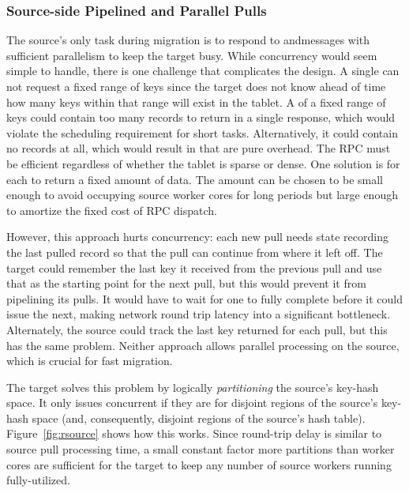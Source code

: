 \subsubsection{Source-side Pipelined and Parallel Pulls}
\label{sec:source}
The source's only task during migration is to respond
to \pull and\linebreak{}\priopull messages with sufficient parallelism to
keep the target busy. While concurrency would seem
simple to handle, there is one challenge that complicates the design.
A single \pull can not request a fixed range of keys since the target does not know
ahead of time how many keys within that range will exist in the tablet. A \pull of a fixed range of keys
could contain too many records to return in a single response, which would violate
the scheduling requirement for short tasks. Alternatively, it could contain no
records at all, which would result in \pulls that are pure overhead.
The \pull RPC must be efficient
regardless of whether the tablet is sparse or dense. One solution is for each
\pull to return a fixed amount of data. The amount can be chosen to be small
enough to avoid occupying source worker cores for long periods but large
enough to amortize the fixed cost of RPC dispatch.

However, this approach hurts concurrency:  each new pull needs state recording
the last pulled record so that the pull can continue from where it left off.
The target could remember the last key it received from the previous pull and
use that as the starting point for the next pull, but this would prevent it
from pipelining its pulls.
It would have to wait for one to fully complete before it could
issue the next, making network round trip latency into a significant bottleneck.
Alternately, the source could track
the last key returned for each pull, but this has the same problem.  Neither
approach allows parallel \pull processing on the source, which is
crucial for fast migration.

The target solves this problem by logically {\em partitioning} the source's key-hash
space. It only issues concurrent \pulls if they are for disjoint regions of the
source's key-hash space (and, consequently, disjoint regions of the source's
hash table).  Figure~\ref{fig:rsource} shows how this works.
Since round-trip delay is similar to source pull processing time,
a small constant factor more partitions than worker cores are sufficient for the
target to keep any number of source workers running fully-utilized.

